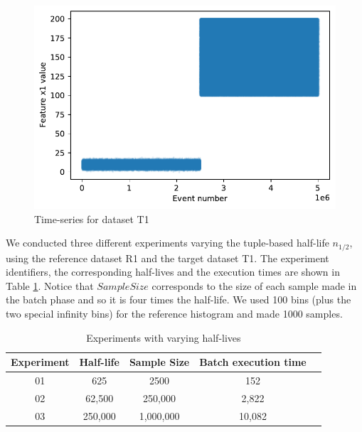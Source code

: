 \documentclass[sigconf]{acmart}
\begin{document}
\begin{figure}[!htb]
    \begin{center}
      \includegraphics[scale=0.5]{figures/01-target.pdf}
      \caption{Time-series for dataset T1}
      \label{fig:timeseries-t1}
    \end{center}
\end{figure}
We conducted three different experiments varying the tuple-based half-life $n_{1/2}$, using the reference dataset R1 and the target dataset T1. The experiment identifiers, the corresponding half-lives and the execution times are shown in Table \ref{tbl:tests-half-life}. Notice that $Sample Size$ corresponds to the size of each sample made in the batch phase and so it is four times the half-life. We used 100 bins (plus the two special infinity bins) for the reference histogram and made 1000 samples.
\begin{table}[!htb]
    \begin{center}
        \begin{tabular}{|c|c|c|c|c|}
        \hline
        \multicolumn{1}{|l|}{\textbf{Experiment}} & \multicolumn{1}{l|}{\textbf{Half-life}} & \multicolumn{1}{l|}{\textbf{Sample Size}} & \multicolumn{1}{l|}{\textbf{Batch execution time}} \\ \hline
        01  & 625  & 2500 & 152                                                          \\ \hline
        02                                        & 62,500                                  & 250,000                               & 2,822                                                        \\ \hline
        03                                        & 250,000                                 & 1,000,000                           & 10,082                                                       \\ \hline
        \end{tabular}
    \end{center}
    \caption{Experiments with varying half-lives}
    \label{tbl:tests-half-life}
\end{table}
\end{document}
